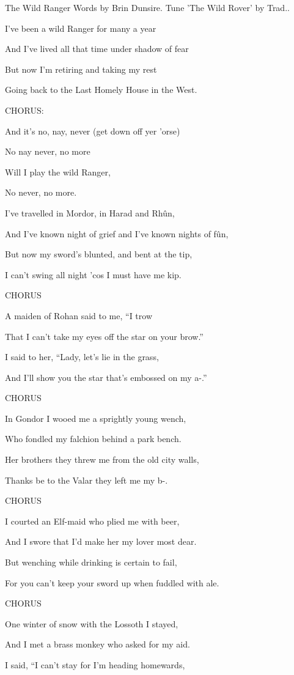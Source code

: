 The Wild Ranger
Words by Brin Dunsire.
Tune ’The Wild Rover’ by Trad..


I’ve been a wild Ranger for many a year

And I’ve lived all that time under shadow of fear

But now I’m retiring and taking my rest

Going back to the Last Homely House in the West.

CHORUS:

And it’s no, nay, never (get down off yer ’orse)

No nay never, no more

Will I play the wild Ranger,

No never, no more.


I’ve travelled in Mordor, in Harad and Rh\^un,

And I’ve known night of grief and I’ve known nights of f\^un,

But now my sword’s blunted, and bent at the tip,

I can’t swing all night ’cos I must have me kip.

CHORUS

A maiden of Rohan said to me, “I trow

That I can’t take my eyes off the star on your brow.”

I said to her, “Lady, let’s lie in the grass,

And I’ll show you the star that’s embossed on my a-.”

CHORUS

In Gondor I wooed me a sprightly young wench,

Who fondled my falchion behind a park bench.

Her brothers they threw me from the old city walls,

Thanks be to the Valar they left me my b-.

CHORUS

I courted an Elf-maid who plied me with beer,

And I swore that I’d make her my lover most dear.

But wenching while drinking is certain to fail,

For you can’t keep your sword up when fuddled with ale.

CHORUS

One winter of snow with the Lossoth I stayed,

And I met a brass monkey who asked for my aid.

I said, “I can’t stay for I’m heading homewards,

